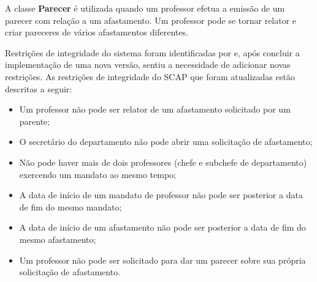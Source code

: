 A classe \textbf{Parecer} é utilizada quando um professor efetua a emissão de um parecer com relação a um afastamento. Um professor pode se tornar relator e criar pareceres de vários afastamentos diferentes. 

Restrições de integridade do sistema foram identificadas por  e, após concluir a implementação de uma nova versão,  sentiu a necessidade de adicionar novas restrições. As restrições de integridade do SCAP que foram atualizadas estão descritas a seguir:
 
\begin{itemize}

	\item Um professor não pode ser relator de um afastamento solicitado por um parente;
	
	\item O secretário do departamento não pode abrir uma solicitação de afastamento;
	
	\item Não pode haver mais de dois professores (chefe e subchefe de departamento) exercendo um mandato ao mesmo tempo;
	
	\item A data de início de um mandato de professor não pode ser posterior a data de fim do mesmo mandato;
	
	\item A data de início de um afastamento não pode ser posterior a data de fim do mesmo afastamento;
	
	\item Um professor não pode ser solicitado para dar um parecer sobre sua própria solicitação de afastamento. 
   
\end{itemize} 
